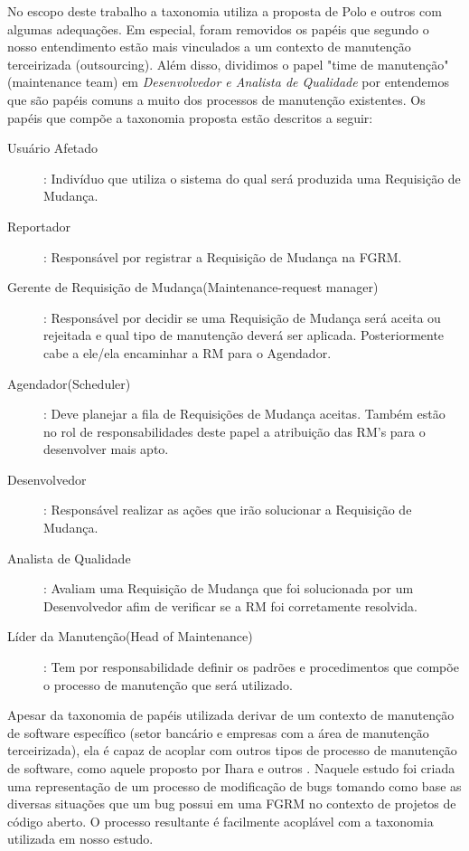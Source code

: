\documentclass[msc]{ppgccufmg} %
\begin{document}
No escopo deste trabalho a taxonomia utiliza a proposta de Polo e outros com algumas adequações. Em
especial, foram removidos os papéis que segundo o nosso entendimento estão mais vinculados a um
contexto de manutenção terceirizada (outsourcing). Além disso, dividimos o papel "time de manutenção"
(maintenance team) em \textit{Desenvolvedor e Analista de Qualidade} por entendemos que são papéis
comuns a muito dos processos de manutenção existentes. Os papéis que compõe a taxonomia proposta
estão descritos a seguir:

\begin{description}
	\item[Usuário Afetado]: Indivíduo que utiliza o sistema do qual será produzida uma Requisição de
		Mudança.
	\item[Reportador]: Responsável por registrar a Requisição de Mudança na FGRM.
	\item[Gerente de Requisição de Mudança(Maintenance-request manager)]: Responsável por decidir se
		uma Requisição de Mudança será aceita ou rejeitada e qual tipo de manutenção deverá ser
		aplicada. Posteriormente cabe a ele/ela encaminhar a RM para o Agendador.
	\item[Agendador(Scheduler)]: Deve planejar a fila de Requisições de Mudança aceitas. Também
		estão no rol de responsabilidades deste papel a atribuição das RM's para o desenvolver
		mais apto.
	\item[Desenvolvedor]: Responsável realizar as ações que irão solucionar a Requisição de Mudança.
	\item[Analista de Qualidade]: Avaliam uma Requisição de Mudança que foi solucionada por um
		Desenvolvedor afim de verificar se a RM foi corretamente resolvida.
	\item[Líder da Manutenção(Head of Maintenance)]: Tem por responsabilidade definir os padrões
		e procedimentos que compõe o processo de manutenção que será utilizado.
\end{description}

Apesar da taxonomia de papéis utilizada derivar de um contexto de manutenção de software específico
(setor bancário e empresas com a área de manutenção terceirizada), ela é capaz de acoplar com outros
tipos de processo de manutenção de software, como aquele proposto por Ihara e outros
\cite{Ihara:2009:AMI:1595808.1595833}. Naquele estudo foi criada uma representação de um processo
de modificação de bugs tomando como base as diversas situações que um bug possui em uma FGRM no contexto de projetos de código aberto. O processo resultante é facilmente acoplável com a taxonomia utilizada em
nosso estudo.
\end{document}
